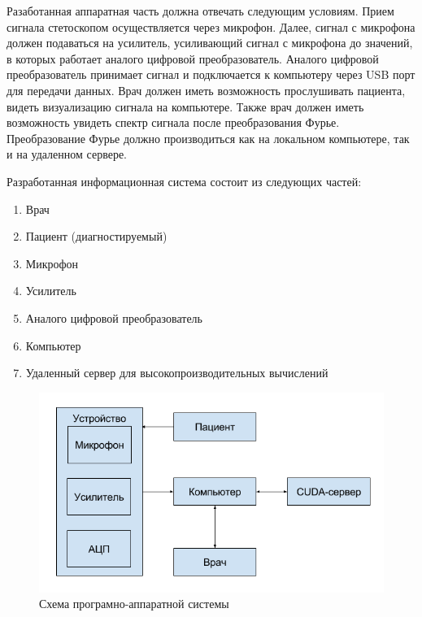 \documentclass[../paper.tex]{subfiles}
\begin{document}
Разаботанная аппаратная часть должна отвечать следующим условиям. Прием сигнала стетоскопом осуществляется через микрофон. Далее, сигнал с микрофона должен подаваться на усилитель, усиливающий сигнал с микрофона до значений, в которых работает аналого цифровой преобразователь. Аналого цифровой преобразователь принимает сигнал и подключается к компьютеру через USB порт для передачи данных. Врач должен иметь возможность прослушивать пациента, видеть визуализацию сигнала на компьютере. Также врач должен иметь возможность увидеть спектр сигнала после преобразования Фурье. Преобразование Фурье должно производиться как на локальном компьютере, так и на удаленном сервере.

Разработанная информационная система состоит из следующих частей:
\begin{enumerate}
  \item Врач
  \item Пациент (диагностируемый)
  \item Микрофон
  \item Усилитель
  \item Аналого цифровой преобразователь
  \item Компьютер
  \item Удаленный сервер для высокопроизводительных вычислений
\end{enumerate}

\begin{figure}[H]
\centering
\includegraphics[width=\textwidth]{images/blueprint.png}
\caption{Схема програмно-аппаратной системы}
\end{figure}
\end{document}
